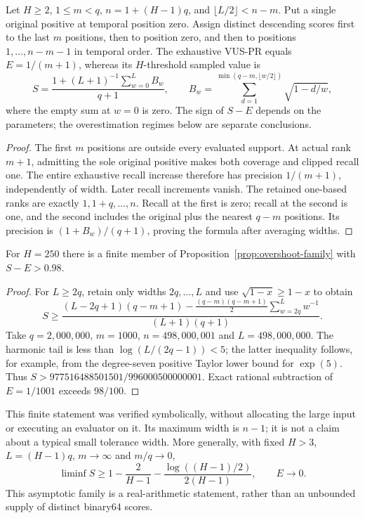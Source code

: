 \begin{proposition}
\label{prop:overshoot-family}
Let $H\geq2$, $1\leq m<q$, $n=1+(H-1)q$, and
$\lfloor L/2\rfloor<n-m$. Put a single original positive at temporal
position zero. Assign distinct descending scores first to the last $m$
positions, then to position zero, and then to positions
$1,\ldots,n-m-1$ in temporal order. The exhaustive VUS-PR equals
$E=1/(m+1)$, whereas its $H$-threshold sampled value is
\begin{equation}
 S=\frac{1+(L+1)^{-1}\sum_{w=0}^L B_w}{q+1},\qquad
 B_w=\sum_{d=1}^{\min(q-m,\lfloor w/2\rfloor)}\sqrt{1-d/w},
 \label{eq:overshoot-value}
\end{equation}
where the empty sum at $w=0$ is zero. The sign of $S-E$ depends on the
parameters; the overestimation regimes below are separate conclusions.
\end{proposition}
\begin{proof}
The first $m$ positions are outside every evaluated support. At actual
rank $m+1$, admitting the sole original positive makes both coverage and
clipped recall one. The entire exhaustive recall increase therefore has
precision $1/(m+1)$, independently of width. Later recall increments vanish.
The retained one-based ranks are exactly $1,1+q,\ldots,n$. Recall at the
first is zero; recall at the second is one, and the second includes the
original plus the nearest $q-m$ positions. Its precision is
$(1+B_w)/(q+1)$, proving the formula after averaging widths.
\end{proof}

\begin{corollary}
\label{cor:large-overshoot}
For $H=250$ there is a finite member of
Proposition~\ref{prop:overshoot-family} with $S-E>0.98$.
\end{corollary}
\begin{proof}
For $L\geq2q$, retain only widths $2q,\ldots,L$ and use
$\sqrt{1-x}\geq1-x$ to obtain
\[
 S\geq\frac{(L-2q+1)(q-m+1)
       -\frac{(q-m)(q-m+1)}2\sum_{w=2q}^Lw^{-1}}
       {(L+1)(q+1)}.
\]
Take $q=2{,}000{,}000$, $m=1000$, $n=498{,}000{,}001$ and
$L=498{,}000{,}000$. The harmonic tail is less than
$\log(L/(2q-1))<5$; the latter inequality follows, for example, from
the degree-seven positive Taylor lower bound for $\exp(5)$.
Thus $S>977516488501501/996000500000001$. Exact rational subtraction
of $E=1/1001$ exceeds $98/100$.
\end{proof}
This finite statement was verified symbolically, without allocating the
large input or executing an evaluator on it. Its maximum width is $n-1$;
it is not a claim about a typical small tolerance width. More generally,
with fixed $H>3$, $L=(H-1)q$, $m\to\infty$ and $m/q\to0$,
\[
 \liminf S\geq1-\frac2{H-1}
                   -\frac{\log((H-1)/2)}{2(H-1)},\qquad E\to0.
\]
This asymptotic family is a real-arithmetic statement, rather than an
unbounded supply of distinct binary64 scores.

